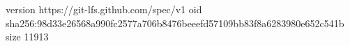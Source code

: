 version https://git-lfs.github.com/spec/v1
oid sha256:98d33e26568a990fc2577a706b8476beeefd57109bb83f8a6283980e652c541b
size 11913
